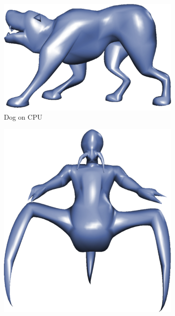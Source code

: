 \begin{figure}
	\centering
	\begin{subfigure}[b]{0.2\textwidth}
		\centering
		\includegraphics[width=\textwidth]{content/img/results/dogCPU.png}
		\caption{Dog on CPU}
		\label{fig:results:cpugpu:cpuDog}
	\end{subfigure}
	\hspace{0.1\textwidth}
	\begin{subfigure}[b]{0.2\textwidth}
		\centering
		\includegraphics[width=\textwidth]{content/img/results/voreCPU.png}

\end{subfigure}
\end{figure}
